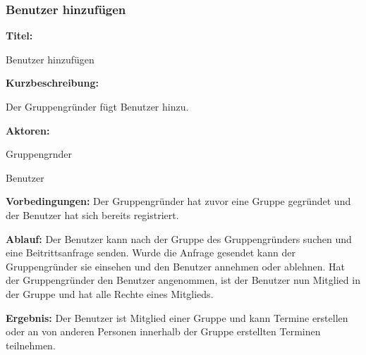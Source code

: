 \documentclass{scrartcl}
\begin{document}
	\subsubsection{Benutzer hinzufügen}
	\begin{description}
		\item \textbf{Titel:}
		\begin{description}
			\item Benutzer hinzufügen
		\end{description}
		\item \textbf{Kurzbeschreibung:}
		\begin{description}
			\item Der Gruppengründer fügt Benutzer hinzu.
		\end{description}
		\item \textbf{Aktoren:}
		\begin{description}
			\item \gls{Gruppengrnder}
			\item Benutzer
		\end{description}
		\item \textbf{Vorbedingungen:} \newline
		 Der Gruppengründer hat zuvor eine Gruppe gegründet und der Benutzer hat sich bereits registriert.
		\item \textbf{Ablauf:} \newline Der Benutzer kann nach der Gruppe des Gruppengründers suchen und eine Beitrittsanfrage senden. Wurde die Anfrage gesendet kann der Gruppengründer sie einsehen und den Benutzer annehmen oder ablehnen. Hat der Gruppengründer den Benutzer angenommen, ist der Benutzer nun \gls{Mitglied} in der Gruppe und hat alle Rechte eines Mitglieds.
		\item \textbf{Ergebnis:} \newline Der Benutzer ist \gls{Mitglied} einer Gruppe und kann Termine erstellen oder an von anderen Personen innerhalb der Gruppe erstellten Terminen teilnehmen.
	\end{description}
	
	\newpage
	
\end{document}
